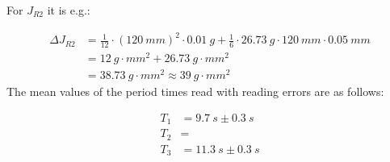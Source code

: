         For $ J_{R2} $ it is e.g.:\par
        \begin{align*}
            \Delta J_{R2}   &=\frac{1}{12}\cdot (\SI{120}{mm})^2\cdot \SI{0.01}{g} + \frac{1}{6}\cdot \SI{26.73}{g}\cdot \SI{120}{mm}\cdot \SI{0.05}{mm}\\
                            &=\SI{12}{g\cdot mm^2}+\SI{26.73}{g\cdot mm^2}\\
                            &=\SI{38.73}{g\cdot mm^2} \approx \SI{39}{g\cdot mm^2}
        \end{align*}
        The mean values of the period times read with reading errors are as follows:\par
        \begin{align}
            T_1 &=\SI{9.7}{s} \pm \SI{0.3}{s} \\
            T_2 &= \\
            T_3 &=\SI{11.3}{s} \pm \SI{0.3}{s}
        \end{align}